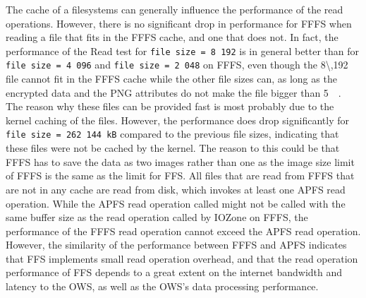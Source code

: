 The cache of a filesystems can generally influence the performance of the read operations. However, there is no significant drop in performance for \gls{FFFS} when reading a file that fits in the \gls{FFFS} cache, and one that does not. In fact, the performance of the Read test for \texttt{file size = 8\,192} is in general better than for \texttt{file size = 4\,096} and \texttt{file size = 2\,048} on \gls{FFFS}, even though the \SI{8\,192}{\kilo\byte} file cannot fit in the \gls{FFFS} cache while the other file sizes can, as long as the encrypted data and the PNG attributes do not make the file bigger than \SI[per-mode = symbol]{5}{\mega\byte}. The reason why these files can be provided fast is most probably due to the kernel caching of the files. However, the performance does drop significantly for \texttt{file size = 262\,144\,kB} compared to the previous file sizes, indicating that these files were not be cached by the kernel. The reason to this could be that \gls{FFFS} has to save the data as two images rather than one as the image size limit of \gls{FFFS} is the same as the limit for \gls{FFS}. All files that are read from \gls{FFFS} that are not in any cache are read from disk, which invokes at least one \gls{APFS} read operation. While the \gls{APFS} read operation called might not be called with the same buffer size as the read operation called by IOZone on \gls{FFFS}, the performance of the \gls{FFFS} read operation cannot exceed the \gls{APFS} read operation. However, the similarity of the performance between \gls{FFFS} and \gls{APFS} indicates that \gls{FFS} implements small read operation overhead, and that the read operation performance of \gls{FFS} depends to a great extent on the internet bandwidth and latency to the \gls{OWS}, as well as the \gls{OWS}'s data processing performance.

